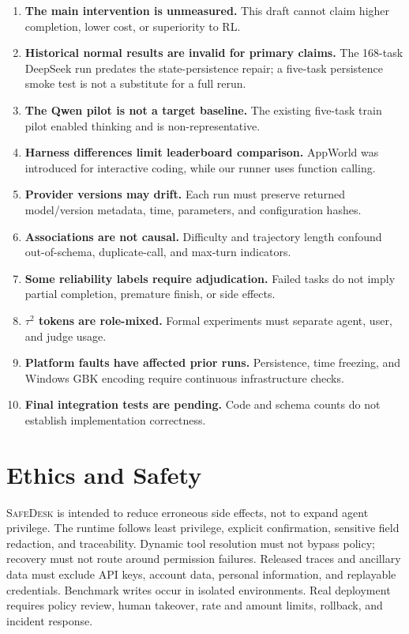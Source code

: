 \documentclass[10pt]{article}
\newcommand{\safedesk}{\textsc{SafeDesk}}
\begin{document}
\begin{enumerate}[leftmargin=*,itemsep=2pt]
  \item \textbf{The main intervention is unmeasured.} This draft cannot claim
        higher completion, lower cost, or superiority to RL.
  \item \textbf{Historical normal results are invalid for primary claims.} The
        168-task DeepSeek run predates the state-persistence repair; a five-task
        persistence smoke test is not a substitute for a full rerun.
  \item \textbf{The Qwen pilot is not a target baseline.} The existing five-task
        train pilot enabled thinking and is non-representative.
  \item \textbf{Harness differences limit leaderboard comparison.} AppWorld was
        introduced for interactive coding, while our runner uses function calling.
  \item \textbf{Provider versions may drift.} Each run must preserve returned
        model/version metadata, time, parameters, and configuration hashes.
  \item \textbf{Associations are not causal.} Difficulty and trajectory length
        confound out-of-schema, duplicate-call, and max-turn indicators.
  \item \textbf{Some reliability labels require adjudication.} Failed tasks do
        not imply partial completion, premature finish, or side effects.
  \item \textbf{$\tau^2$ tokens are role-mixed.} Formal experiments must separate
        agent, user, and judge usage.
  \item \textbf{Platform faults have affected prior runs.} Persistence, time
        freezing, and Windows GBK encoding require continuous infrastructure checks.
  \item \textbf{Final integration tests are pending.} Code and schema counts do
        not establish implementation correctness.
\end{enumerate}

\section{Ethics and Safety}

\safedesk{} is intended to reduce erroneous side effects, not to expand agent
privilege. The runtime follows least privilege, explicit confirmation, sensitive
field redaction, and traceability. Dynamic tool resolution must not bypass policy;
recovery must not route around permission failures. Released traces and ancillary
data must exclude API keys, account data, personal information, and replayable
credentials. Benchmark writes occur in isolated environments. Real deployment
requires policy review, human takeover, rate and amount limits, rollback, and
incident response.
\end{document}

